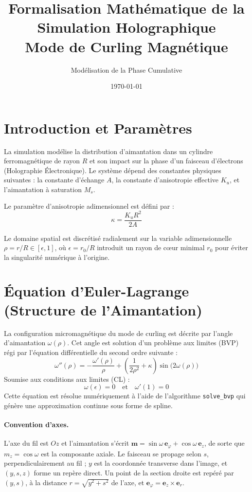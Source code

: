 \documentclass[11pt, a4paper]{article}
\title{Formalisation Mathématique de la Simulation Holographique \\ Mode de Curling Magnétique}
\author{Modélisation de la Phase Cumulative}
\date{\today}
\begin{document}
\maketitle

\section{Introduction et Paramètres}
La simulation modélise la distribution d'aimantation dans un cylindre ferromagnétique de rayon $R$ et son impact sur la phase d'un faisceau d'électrons (Holographie Électronique). Le système dépend des constantes physiques suivantes : la constante d'échange $A$, la constante d'anisotropie effective $K_u$, et l'aimantation à saturation $M_s$. 

Le paramètre d'anisotropie adimensionnel est défini par :
\begin{equation}
    \kappa = \frac{K_u R^2}{2A}
\end{equation}

Le domaine spatial est discrétisé radialement sur la variable adimensionnelle $\rho = r/R \in [\epsilon, 1]$, où $\epsilon = r_0/R$ introduit un rayon de cœur minimal $r_0$ pour éviter la singularité numérique à l'origine.

\section{Équation d'Euler-Lagrange (Structure de l'Aimantation)}
La configuration micromagnétique du mode de curling est décrite par l'angle d'aimantation $\omega(\rho)$. Cet angle est solution d'un problème aux limites (BVP) régi par l'équation différentielle du second ordre suivante :
\begin{equation}
    \omega''(\rho) = -\frac{\omega'(\rho)}{\rho} + \left( \frac{1}{2\rho^2} + \kappa \right) \sin\big(2\omega(\rho)\big)
\end{equation}
Soumise aux conditions aux limites (CL) :
\begin{equation}
    \omega(\epsilon) = 0 \quad \text{et} \quad \omega'(1) = 0
\end{equation}
Cette équation est résolue numériquement à l'aide de l'algorithme \texttt{solve\_bvp} qui génère une approximation continue sous forme de spline.

\paragraph{Convention d'axes.} L'axe du fil est $Oz$ et l'aimantation s'écrit $\mathbf{m} = \sin\omega\,\mathbf{e}_\varphi + \cos\omega\,\mathbf{e}_z$, de sorte que $m_z = \cos\omega$ est la composante axiale. Le faisceau se propage selon $s$, perpendiculairement au fil ; $y$ est la coordonnée transverse dans l'image, et $(y, s, z)$ forme un repère direct. Un point de la section droite est repéré par $(y, s)$, à la distance $r = \sqrt{y^2 + s^2}$ de l'axe, et $\mathbf{e}_\varphi = \mathbf{e}_z \times \mathbf{e}_r$.
\end{document}
